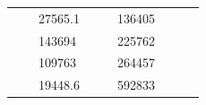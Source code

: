 \begin{table}[]
\begin{tabular}{|cclccllll}
\multicolumn{1}{|c|}{\cellcolor[HTML]{FFFFC7}}                                & \multicolumn{1}{c|}{\cellcolor[HTML]{DDFDFF}}                      & \multicolumn{1}{l|}{\cellcolor[HTML]{DAE8FC}27565.1}   & \multicolumn{1}{c|}{\cellcolor[HTML]{FFFFC7}}                                & \multicolumn{1}{c|}{\cellcolor[HTML]{DDFDFF}}                       & \multicolumn{1}{l|}{\cellcolor[HTML]{DDFDFF}136405}    &                                                                              &                                                                    &                                                        \\ \cline{3-3} \cline{6-6}
\multicolumn{1}{|c|}{\cellcolor[HTML]{FFFFC7}}                                & \multicolumn{1}{c|}{\cellcolor[HTML]{DDFDFF}}                      & \multicolumn{1}{l|}{\cellcolor[HTML]{DDFDFF}143694}    & \multicolumn{1}{c|}{\cellcolor[HTML]{FFFFC7}}                                & \multicolumn{1}{c|}{\cellcolor[HTML]{DDFDFF}}                       & \multicolumn{1}{l|}{\cellcolor[HTML]{DAE8FC}225762}    &                                                                              &                                                                    &                                                        \\ \cline{3-3} \cline{6-6}
\multicolumn{1}{|c|}{\cellcolor[HTML]{FFFFC7}}                                & \multicolumn{1}{c|}{\cellcolor[HTML]{DDFDFF}}                      & \multicolumn{1}{l|}{\cellcolor[HTML]{DAE8FC}109763}    & \multicolumn{1}{c|}{\cellcolor[HTML]{FFFFC7}}                                & \multicolumn{1}{c|}{\cellcolor[HTML]{DDFDFF}}                       & \multicolumn{1}{l|}{\cellcolor[HTML]{DDFDFF}264457}    &                                                                              &                                                                    &                                                        \\ \cline{3-3} \cline{6-6}
\multicolumn{1}{|c|}{\cellcolor[HTML]{FFFFC7}}                                & \multicolumn{1}{c|}{\cellcolor[HTML]{DDFDFF}}                      & \multicolumn{1}{l|}{\cellcolor[HTML]{DDFDFF}19448.6}   & \multicolumn{1}{c|}{\cellcolor[HTML]{FFFFC7}}                                & \multicolumn{1}{c|}{\cellcolor[HTML]{DDFDFF}}                       & \multicolumn{1}{l|}{\cellcolor[HTML]{DAE8FC}592833}    &                                                                              &                                                                    &                                                        \\ \cline{3-3} \cline{6-6}

\end{tabular}
\end{table}
